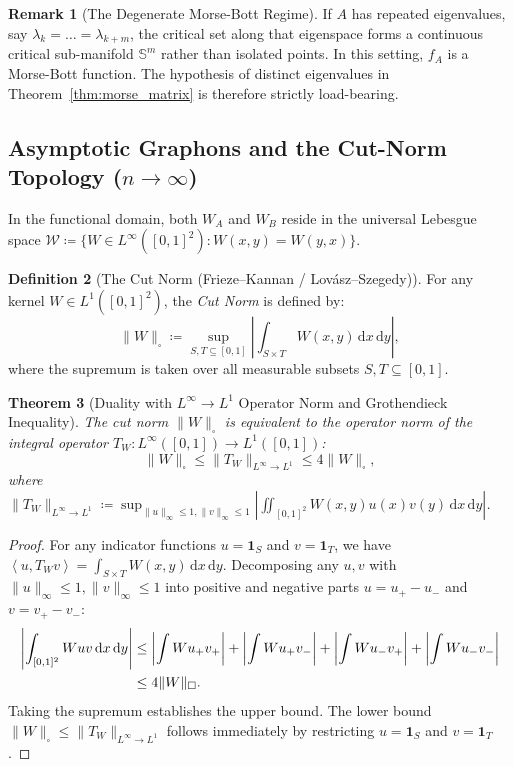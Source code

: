 \documentclass[11pt,a4paper,reqno]{amsart}
\newtheorem{theorem}{Theorem}[section]
\theoremstyle{definition}
\newtheorem{definition}[theorem]{Definition}
\newtheorem{remark}[theorem]{Remark}
\numberwithin{equation}{section}
\providecommand{\Sph}{\mathbb{S}}
\providecommand{\cutnorm}[1]{\|#1\|_{\square}}
\newcommand{\inner}[2]{\left\langle #1, #2 \right\rangle}
\newcommand{\dif}{\,\mathrm{d}}
\providecommand{\Sph}{\mathbb{S}}
\providecommand{\cutnorm}[1]{\|#1\|_{\square}}
\begin{document}
\begin{remark}[The Degenerate Morse-Bott Regime]
If $A$ has repeated eigenvalues, say $\lambda_k = \dots = \lambda_{k+m}$, the critical set along that eigenspace forms a continuous critical sub-manifold $\Sph^m$ rather than isolated points. In this setting, $f_A$ is a Morse-Bott function. The hypothesis of distinct eigenvalues in Theorem~\ref{thm:morse_matrix} is therefore strictly load-bearing.
\end{remark}

\subsection{Asymptotic Graphons and the Cut-Norm Topology (\texorpdfstring{$n \to \infty$}{n -> infty})}
\label{subsec:graphon_cutnorm}

In the functional domain, both $W_A$ and $W_B$ reside in the universal Lebesgue space $\mathcal{W} \coloneqq \{W \in L^\infty([0, 1]^2) \colon W(x, y) = W(y, x)\}$.

\begin{definition}[The Cut Norm (Frieze--Kannan / Lov\'asz--Szegedy)]
For any kernel $W \in L^1([0, 1]^2)$, the \emph{Cut Norm} is defined by:
\begin{equation}
    \label{eq:cut_norm_def}
    \cutnorm{W} \coloneqq \sup_{S, T \subseteq [0, 1]} \left| \int_{S \times T} W(x, y) \dif x \dif y \right|,
\end{equation}
where the supremum is taken over all measurable subsets $S, T \subseteq [0, 1]$.
\end{definition}

\begin{theorem}[Duality with $L^\infty \to L^1$ Operator Norm and Grothendieck Inequality]
\label{thm:grothendieck_cutnorm}
The cut norm $\cutnorm{W}$ is equivalent to the operator norm of the integral operator $T_W \colon L^\infty([0,1]) \to L^1([0,1])$:
\begin{equation}
    \cutnorm{W} \le \|T_W\|_{L^\infty \to L^1} \le 4 \cutnorm{W},
\end{equation}
where $\|T_W\|_{L^\infty \to L^1} \coloneqq \sup_{\|u\|_\infty \le 1, \|v\|_\infty \le 1} \left| \iint_{[0,1]^2} W(x, y) u(x) v(y) \dif x \dif y \right|$.
\end{theorem}

\begin{proof}
For any indicator functions $u = \mathbf{1}_S$ and $v = \mathbf{1}_T$, we have $\inner{u}{T_W v} = \int_{S \times T} W(x,y) \dif x \dif y$. Decomposing any $u, v$ with $\|u\|_\infty \le 1, \|v\|_\infty \le 1$ into positive and negative parts $u = u_+ - u_-$ and $v = v_+ - v_-$:
\begin{align}
    \left|\int_{[0,1]^2} W u v \dif x \dif y\right| 
    &\le \left|\int W u_+ v_+\right| + \left|\int W u_+ v_-\right| + \left|\int W u_- v_+\right| + \left|\int W u_- v_-\right| \notag \\
    &\le 4 \cutnorm{W}.
\end{align}
Taking the supremum establishes the upper bound. The lower bound $\cutnorm{W} \le \|T_W\|_{L^\infty \to L^1}$ follows immediately by restricting $u = \mathbf{1}_S$ and $v = \mathbf{1}_T$.
\end{proof}
\end{document}
